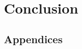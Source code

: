 \documentclass{l4proj}
\begin{document}
\chapter{Conclusion}    

%
% 

\begin{appendices}

\chapter{Appendices}

\end{appendices}






\end{document}
